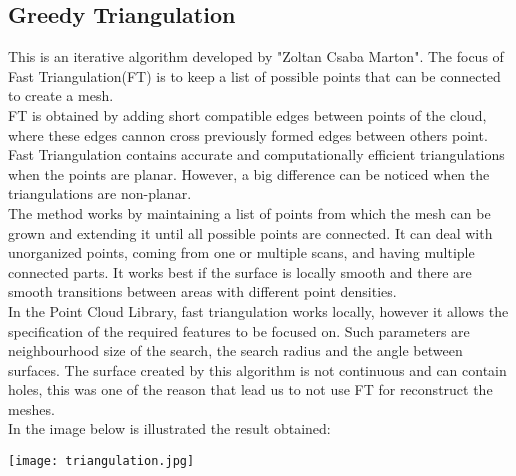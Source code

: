 \documentclass[paper=a4, fontsize=11pt]{scrartcl}	%
\numberwithin{equation}{section}															%
\numberwithin{figure}{section}																%
\numberwithin{table}{section}																%
\begin{document}
\subsection{Greedy Triangulation}
This is an iterative algorithm developed by "Zoltan Csaba Marton".
The focus of Fast Triangulation(FT) is to keep a list of possible points that can be connected to create a mesh.\\
FT is obtained by adding short compatible edges between points of the cloud, where these edges cannon cross previously formed edges between others point.
Fast Triangulation contains accurate and computationally efficient triangulations when the points are planar. However, a big difference can be noticed when the triangulations are non-planar.\\
The method works by maintaining a list of points from which the mesh can be grown and extending it until all possible points are connected. It can deal with unorganized points, coming from one or multiple scans, and having multiple connected parts. It works best if the surface is locally smooth and there are smooth transitions between areas with different point densities.\\
In the Point Cloud Library, fast triangulation works locally, however it allows the specification of the required features to be focused on. Such parameters are neighbourhood size of the search, the search radius and the angle between surfaces.
The surface created by this algorithm is not continuous and can contain holes, this was one of the reason that lead us to not use FT for reconstruct the meshes.\\
In the image below is illustrated the result obtained:
  \begin{center}
  	
  	\texttt{[image: triangulation.jpg]}
  	
  \end{center}
\end{document}

